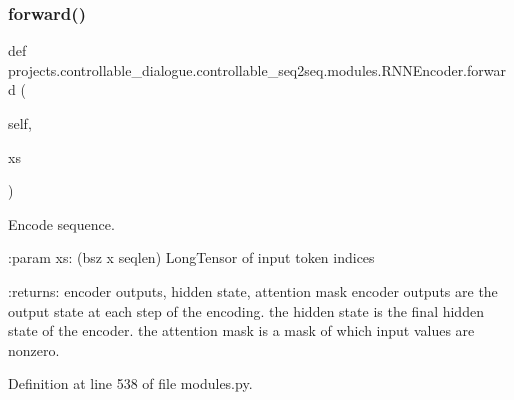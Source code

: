 \subsubsection{\texorpdfstring{forward()}{forward()}}
{\footnotesize\ttfamily def projects.\+controllable\+\_\+dialogue.\+controllable\+\_\+seq2seq.\+modules.\+R\+N\+N\+Encoder.\+forward (\begin{DoxyParamCaption}\item[{}]{self,  }\item[{}]{xs }\end{DoxyParamCaption})}

\begin{DoxyVerb}Encode sequence.

:param xs: (bsz x seqlen) LongTensor of input token indices

:returns: encoder outputs, hidden state, attention mask
    encoder outputs are the output state at each step of the encoding.
    the hidden state is the final hidden state of the encoder.
    the attention mask is a mask of which input values are nonzero.
\end{DoxyVerb}
 

Definition at line 538 of file modules.\+py.


